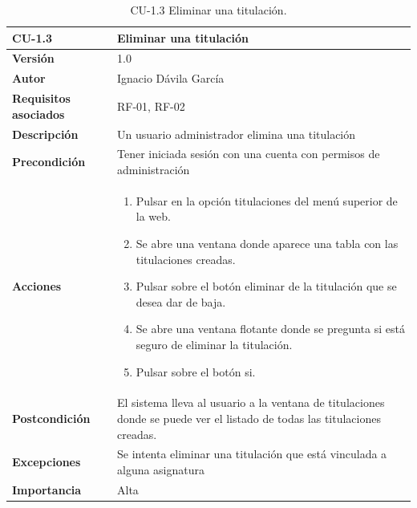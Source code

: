 \begin{table}[p]
	\centering
	\begin{tabularx}{\linewidth}{ p{} p{} }
		\toprule
		\textbf{CU-1.3}    & \textbf{Eliminar una titulación}\\
		\toprule
		\textbf{Versión}              & 1.0    \\
		\textbf{Autor}                & Ignacio Dávila García \\
		\textbf{Requisitos asociados} & RF-01, RF-02 \\
		\textbf{Descripción}          & Un usuario administrador elimina una titulación \\
		\textbf{Precondición}         & Tener iniciada sesión con una cuenta con permisos de administración \\
		\textbf{Acciones}             &
		\begin{enumerate}
			\def\labelenumi{\arabic{enumi}.}
			\tightlist
			\item Pulsar en la opción titulaciones del menú superior de la web.
			\item Se abre una ventana donde aparece una tabla con las titulaciones creadas.
			\item Pulsar sobre el botón eliminar de la titulación que se desea dar de baja.
			\item Se abre una ventana flotante donde se pregunta si está seguro de eliminar la titulación.
			\item Pulsar sobre el botón si.
		\end{enumerate}\\
		\textbf{Postcondición}        & El sistema lleva al usuario a la ventana de titulaciones donde se puede ver el listado de todas las titulaciones creadas. \\
		\textbf{Excepciones}          & Se intenta eliminar una titulación que está vinculada a alguna asignatura \\
		\textbf{Importancia}          & Alta \\
		\bottomrule
	\end{tabularx}
	\caption{CU-1.3 Eliminar una titulación.}
\end{table}


